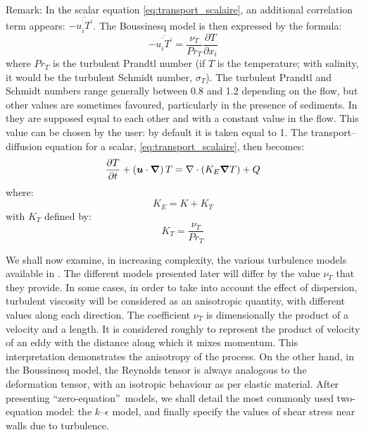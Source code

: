 \begin{CommentBlock}{Remark:}
  In the scalar equation \eqref{eq:transport_scalaire}, an additional correlation
  term appears: $-\overline{u_{i}^{^{\prime}}T^{\prime}}$.
  The Boussinesq model is then expressed by the formula:%
  \begin{equation}
    -\overline{u_{i}^{^{\prime}}T^{\prime}}=\dfrac{\nu_T}{Pr_T}\dfrac{\partial
      T}{\partial x_{i}}%
  \end{equation}
  where $Pr_T$ is the turbulent Prandtl number (if $T$ is the temperature; with salinity,
  it would be the turbulent Schmidt number, $\sigma_{T}$).
  The turbulent Prandtl and Schmidt numbers range generally between 0.8
  and 1.2 depending on the flow, but other values are sometimes favoured,
  particularly in the presence of sediments. In  they are supposed equal
  to each other and with a constant value in the flow. This value can be
  chosen by the user: by default it is taken equal to 1.
  The transport--diffusion equation for a scalar,  \eqref{eq:transport_scalaire}, then becomes:
  \begin{equation}\label{eq:transport_scalaire_turb}
    \dfrac{\partial T}{\partial t}+\left(\bm{u}\cdot\bm{\nabla}\right) T =
    \nabla \cdot\left(K_E\bm{\nabla} T\right)+Q
  \end{equation}
  where:
  \begin{equation}
    K_E=K+K_T
  \end{equation}
  with $K_T$ defined by:
  \begin{equation}
    K_T = \dfrac{\nu_T}{Pr_T}
  \end{equation}
\end{CommentBlock}

We shall now examine, in increasing complexity, the various turbulence models available in .
The different models presented later will differ by the value $\nu_T$ that they provide. In some
cases, in order to take into account the effect of dispersion, turbulent
viscosity will be considered as an anisotropic quantity, with different values
along each direction. The coefficient $\nu_T$ is dimensionally the product
of a velocity and a length. It is considered roughly to represent the product
of velocity of an eddy with the distance along which it mixes momentum. This
interpretation demonstrates the anisotropy of the process. On the other hand,
in the Boussinesq model, the Reynolds tensor%
is always analogous to the deformation tensor, with an isotropic behaviour as
per elastic material.
After presenting \textquotedblleft zero-equation\textquotedblright\ models, we
shall detail the most commonly used two-equation
model: the $k$--$\epsilon$ model, and finally specify the values of shear stress near walls
due to turbulence.

